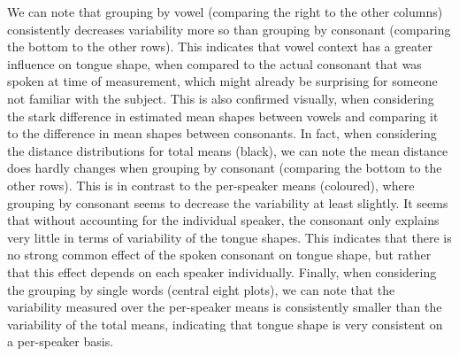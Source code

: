 We can note that grouping by vowel (comparing the right to the other columns) consistently decreases variability more so than grouping by consonant (comparing the bottom to the other rows). 
This indicates that vowel context has a greater influence on tongue shape, when compared to the actual  consonant that was spoken at time of measurement, which might already be surprising for someone not familiar with the subject.
This is also confirmed visually, when considering the stark difference in estimated mean shapes between vowels and comparing it to the difference in mean shapes between consonants.
In fact, when considering the distance distributions for total means (black), we can note the mean distance does hardly changes when grouping by consonant (comparing the bottom to the other rows).
This is in contrast to the per-speaker means (coloured), where grouping by consonant seems to decrease the variability at least slightly.
It seems that without accounting for the individual speaker, the consonant only explains very little in terms of variability of the tongue shapes.
This indicates that there is no strong common effect of the spoken consonant on tongue shape, but rather that this effect depends on each speaker individually.
Finally, when considering the grouping by single words (central eight plots), we can note that the variability measured over the per-speaker means is consistently smaller than the variability of the total means, indicating that tongue shape is very consistent on a per-speaker basis.

